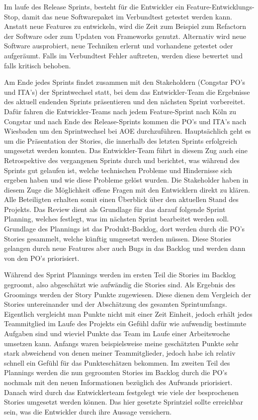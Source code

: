 \documentclass[11pt,a4paper]{article}
\begin{document}
Im laufe des Release Sprints, besteht für die Entwickler ein Feature-Entwicklungs-Stop, damit das neue Softwarepaket im Verbundtest getestet werden kann.
Anstatt neue Features zu entwickeln, wird die Zeit zum Beispiel zum Refactorn der Software oder zum Updaten von Frameworks genutzt. Alternativ wird neue Software ausprobiert, neue Techniken erlernt und vorhandene getestet oder aufgeräumt.
Falls im Verbundtest Fehler auftreten, werden diese bewertet und falls kritisch behoben.

Am Ende jedes Sprints findet zusammen mit den Stakeholdern (Congstar PO's und ITA's) der Sprintwechsel statt, bei dem das Entwickler-Team die Ergebnisse des aktuell endenden Sprints präsentieren und den nächsten Sprint vorbereitet.
Dafür fahren die Entwickler-Teams nach jedem Feature-Sprint nach Köln zu Congstar und nach Ende des Release-Sprints kommen die PO's und ITA's nach Wiesbaden um den Sprintwechsel bei AOE durchzuführen.
Hauptsächlich geht es um die Präsentation der Stories, die innerhalb des letzten Sprints erfolgreich umgesetzt werden konnten.
Das Entwickler-Team führt in diesem Zug auch eine Retrospektive des vergangenen Sprints durch und berichtet, was während des Sprints gut gelaufen ist, welche technischen Probleme und Hindernisse sich ergeben haben und wie diese Probleme gelöst wurden.
Die Stakeholder haben in diesem Zuge die Möglichkeit offene Fragen mit den Entwicklern direkt zu klären. Alle Beteiligten erhalten somit einen Überblick über den aktuellen Stand des Projekts.
Das Review dient als Grundlage für das darauf folgende Sprint Planning, welches festlegt, was im nächsten Sprint bearbeitet werden soll.
Grundlage des Plannings ist das Produkt-Backlog, dort werden durch die PO's Stories gesammelt, welche künftig umgesetzt werden müssen.
Diese Stories gelangen durch neue Features aber auch Bugs in das Backlog und werden dann von den PO's priorisiert.

Während des Sprint Plannings werden im ersten Teil die Stories im Backlog gegroomt, also abgeschätzt wie aufwändig die Stories sind.
Als Ergebnis des Groomings werden der Story Punkte zugewiesen. Diese dienen dem Vergleich der Stories untereinander und der Abschätzung des gesamten Sprintumfangs. Eigentlich vergleicht man Punkte nicht mit einer Zeit Einheit, jedoch erhält jedes Teammitglied im Laufe des Projekts ein Gefühl dafür wie aufwendig bestimmte Aufgaben sind und wieviel Punkte das Team im Laufe einer Arbeitswoche umsetzen kann. Anfangs waren beispielsweise meine geschätzten Punkte sehr stark abweichend von denen meiner Teammitglieder, jedoch habe ich relativ schnell ein Gefühl für das Punkteschätzen bekommen.
Im zweiten Teil des Plannings werden die nun gegroomten Stories im Backlog durch die PO's nochmals mit den neuen Informationen bezüglich des Aufwands priorisiert. Danach wird durch das Entwicklerteam festgelegt wie viele der besprochenen Stories umgesetzt werden können. Das hier gesetzte Sprintziel sollte erreichbar sein, was die Entwickler durch ihre Aussage versichern.
\end{document}
